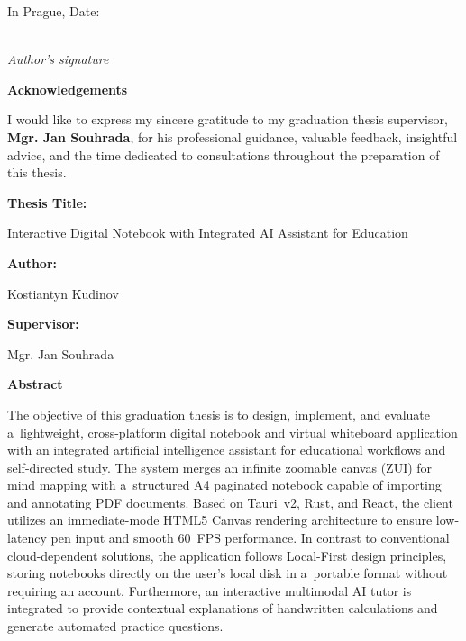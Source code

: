 \documentclass[12pt, a4paper, oneside]{article}
\newcommand{\NazevPrace}{Interactive Digital Notebook with Integrated AI Assistant for Education}
\newcommand{\Autor}{Kostiantyn Kudinov}
\newcommand{\Vedouci}{Mgr. Jan Souhrada}
\newcommand{\nadpismimoobsah}[1]{%
    \vspace{6pt}%
    {\normalfont\fontsize{14pt}{18pt}\selectfont\sffamily\bfseries #1\par}%
    \vspace{2pt}%
}
\begin{document}
\vspace{1.2cm}
In Prague, Date: \makebox[4cm]{\dotfill}

\vspace{1.8cm}
\makebox[6cm]{\dotfill} \\
\textit{Author's signature}

\clearpage

\vspace*{6.5cm}

\nadpismimoobsah{Acknowledgements}

I would like to express my sincere gratitude to my graduation thesis supervisor, \textbf{\Vedouci}, for his professional guidance, valuable feedback, insightful advice, and the time dedicated to consultations throughout the preparation of this thesis.

\clearpage

\pagestyle{fancy}
\setcounter{page}{5}

\nadpismimoobsah{Thesis Title:}
\NazevPrace

\nadpismimoobsah{Author:}
\Autor

\nadpismimoobsah{Supervisor:}
\Vedouci

\nadpismimoobsah{Abstract}
The objective of this graduation thesis is to design, implement, and evaluate a~lightweight, cross-platform digital notebook and virtual whiteboard application with an integrated artificial intelligence assistant for educational workflows and self-directed study. The system merges an infinite zoomable canvas (ZUI) for mind mapping with a~structured A4 paginated notebook capable of importing and annotating PDF documents. Based on Tauri~v2, Rust, and React, the client utilizes an immediate-mode HTML5 Canvas rendering architecture to ensure low-latency pen input and smooth 60~FPS performance. In contrast to conventional cloud-dependent solutions, the application follows Local-First design principles, storing notebooks directly on the user's local disk in a~portable format without requiring an account. Furthermore, an interactive multimodal AI tutor is integrated to provide contextual explanations of handwritten calculations and generate automated practice questions.
\end{document}
